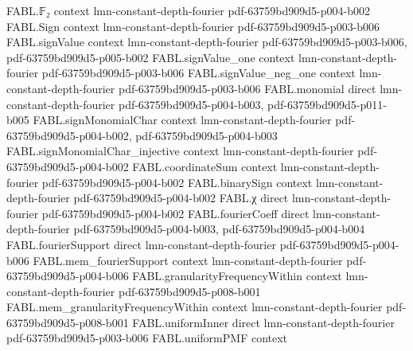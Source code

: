 \begin{theorem}
\label{FABL.integral_fourierObservation_uniformPMF}
\leanok
{}
\proofstep
  {FABL.𝔽₂}
  {context}
  {lmn-constant-depth-fourier}
  {pdf-63759bd909d5-p004-b002}
\proofstep
  {FABL.Sign}
  {context}
  {lmn-constant-depth-fourier}
  {pdf-63759bd909d5-p003-b006}
\proofstep
  {FABL.signValue}
  {context}
  {lmn-constant-depth-fourier}
  {pdf-63759bd909d5-p003-b006,
    pdf-63759bd909d5-p005-b002}
\proofstep
  {FABL.signValue_one}
  {context}
  {lmn-constant-depth-fourier}
  {pdf-63759bd909d5-p003-b006}
\proofstep
  {FABL.signValue_neg_one}
  {context}
  {lmn-constant-depth-fourier}
  {pdf-63759bd909d5-p003-b006}
\proofstep
  {FABL.monomial}
  {direct}
  {lmn-constant-depth-fourier}
  {pdf-63759bd909d5-p004-b003,
    pdf-63759bd909d5-p011-b005}
\proofstep
  {FABL.signMonomialChar}
  {context}
  {lmn-constant-depth-fourier}
  {pdf-63759bd909d5-p004-b002,
    pdf-63759bd909d5-p004-b003}
\proofstep
  {FABL.signMonomialChar_injective}
  {context}
  {lmn-constant-depth-fourier}
  {pdf-63759bd909d5-p004-b002}
\proofstep
  {FABL.coordinateSum}
  {context}
  {lmn-constant-depth-fourier}
  {pdf-63759bd909d5-p004-b002}
\proofstep
  {FABL.binarySign}
  {context}
  {lmn-constant-depth-fourier}
  {pdf-63759bd909d5-p004-b002}
\proofstep
  {FABL.χ}
  {direct}
  {lmn-constant-depth-fourier}
  {pdf-63759bd909d5-p004-b002}
\proofstep
  {FABL.fourierCoeff}
  {direct}
  {lmn-constant-depth-fourier}
  {pdf-63759bd909d5-p004-b003,
    pdf-63759bd909d5-p004-b004}
\proofstep
  {FABL.fourierSupport}
  {direct}
  {lmn-constant-depth-fourier}
  {pdf-63759bd909d5-p004-b006}
\proofstep
  {FABL.mem_fourierSupport}
  {context}
  {lmn-constant-depth-fourier}
  {pdf-63759bd909d5-p004-b006}
\proofstep
  {FABL.granularityFrequencyWithin}
  {context}
  {lmn-constant-depth-fourier}
  {pdf-63759bd909d5-p008-b001}
\proofstep
  {FABL.mem_granularityFrequencyWithin}
  {context}
  {lmn-constant-depth-fourier}
  {pdf-63759bd909d5-p008-b001}
\proofstep
  {FABL.uniformInner}
  {direct}
  {lmn-constant-depth-fourier}
  {pdf-63759bd909d5-p003-b006}
\proofstep
  {FABL.uniformPMF}
  {context}

\end{theorem}
